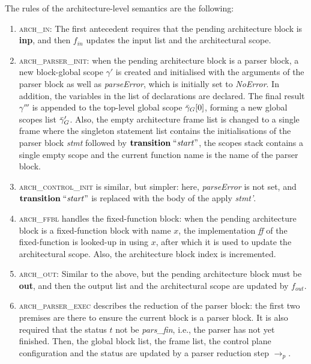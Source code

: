 \documentclass[UTF8]{article}
\begin{document}
The rules of the architecture-level semantics are the following:
\begin{enumerate}
\item \textsc{arch\_in}: The first antecedent requires that the pending architecture block is \textbf{inp}, and then $f_{ \mathit{in} }$ updates the input list and the architectural scope.

\item \textsc{arch\_parser\_init}: when the pending architecture block is a parser block, a new block-global scope $\gamma'$ is created and initialised with the arguments of the parser block as well as \textit{parseError}, which is initially set to \textit{NoError}. In addition, the variables in the list of declarations are declared. The final result $\gamma'''$ is appended to the top-level global scope $\bar{\gamma}_G [0]$, forming a new global scopes list $\bar{\gamma}_G'$. Also, the empty architecture frame list is changed to a single frame where the singleton statement list contains the initialisations of the parser block \textit{stmt} followed by $\textbf{transition} \; ``\mathit{start}"$, the scopes stack contains a single empty scope and the current function name is the name of the parser block.

\item \textsc{arch\_control\_init} is similar, but simpler: here, \textit{parseError} is not set, and $\textbf{transition} \; ``\mathit{start}"$ is replaced with the body of the apply \textit{stmt'}.

\item \textsc{arch\_ffbl} handles the fixed-function block: when the pending architecture block is a fixed-function block with name $x$, the implementation \textit{ff} of the fixed-function is looked-up in \ffbm{} using $x$, after which it is used to update the architectural scope. Also, the architecture block index is incremented.

\item \textsc{arch\_out}: Similar to the above, but the pending architecture block must be \textbf{out}, and then the output list and the architectural scope are updated by $f_{ \mathit{out} }$.

\item \textsc{arch\_parser\_exec} describes the reduction of the parser block: the first two premises are there to ensure the current block is a parser block. It is also required that the status $t$ not be \textit{pars\_fin}, i.e., the parser has not yet finished. Then, the global block list, the frame list, the control plane configuration and the status are updated by a parser reduction step $\longrightarrow_p$.


\end{enumerate}
\end{document}
